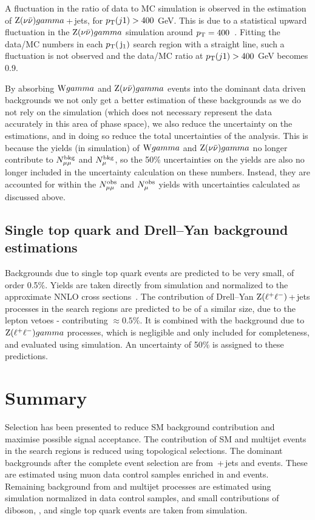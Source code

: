 A fluctuation in the ratio of data to MC simulation is observed in the estimation of $\mathrm{Z} ( \nu \bar{\nu} ) gamma$\,+\,jets, for $p_{\text{T}}(j1) > 400$ GeV.
This is due to a statistical upward fluctuation in the $\mathrm{Z} ( \nu \bar{\nu} ) gamma$ simulation around $p_{\text{T}}=400$~\GeV.
Fitting the data/MC numbers in each $p_{\text{T}}(\,\mathrm{j}_1)$ search region with a straight line, 
such a fluctuation is not observed and the data/MC ratio at $p_{\text{T}}(j1) > 400$ GeV becomes 0.9.



By absorbing $\mathrm{W}gamma$ and $\mathrm{Z} ( \nu \bar{\nu} ) gamma$ events into the dominant data driven backgrounds 
we not only get a better estimation of these backgrounds as we do not rely on the simulation 
(which does not necessary represent the data accurately in this area of phase space), 
we also reduce the uncertainty on the estimations, 
and in doing so reduce the total uncertainties of the analysis.
This is because the yields (in simulation) of $\mathrm{W}gamma$ and $\mathrm{Z} ( \nu \bar{\nu} ) gamma$ no longer contribute to $N^{\rm bkg}_{\mu\mu}$ and $N^{\rm bkg}_{\mu}$, so the 50\% uncertainties on the yields are also no longer included in the uncertainty calculation on these numbers. 
Instead, they are accounted for within the $N^{\rm obs}_{\mu\mu}$ and $N^{\rm obs}_{\mu}$ yields with uncertainties calculated as discussed above.


\subsection{Single top quark and Drell--Yan background estimations}

Backgrounds due to single top quark events are predicted to be very small, of order 0.5\%.
Yields are taken directly from simulation and normalized to the approximate \ac{NNLO} cross sections~\cite{ttbarxs}. 
The contribution of Drell--Yan $\mathrm{Z} ( \ell^{+} \ell^{-} )$\,+\,jets processes in the search regions are predicted to be of a similar size, due to the lepton vetoes - contributing $\approx0.5\%$.
It is combined with the background due to $\mathrm{Z} ( \ell^{+} \ell^{-} ) gamma$ processes, which is negligible and only included for completeness,
and evaluated using simulation.
An uncertainty of 50\% is assigned to these predictions.


\section{Summary}
Selection has been presented to reduce \ac{SM} background contribution and maximise possible signal acceptance. 
The contribution of SM \ttbar and multijet events in the search regions is reduced using topological selections. The dominant backgrounds after the complete event selection are from \znunubr{}\,+\,jets and \wpj{} events. These are estimated using muon data control samples enriched in \zmumubr and \wmunubr events. Remaining background from \ttbar and multijet processes are estimated using simulation normalized in data control samples, and small contributions of diboson, \zellellbr, and single top quark events are taken from simulation.


